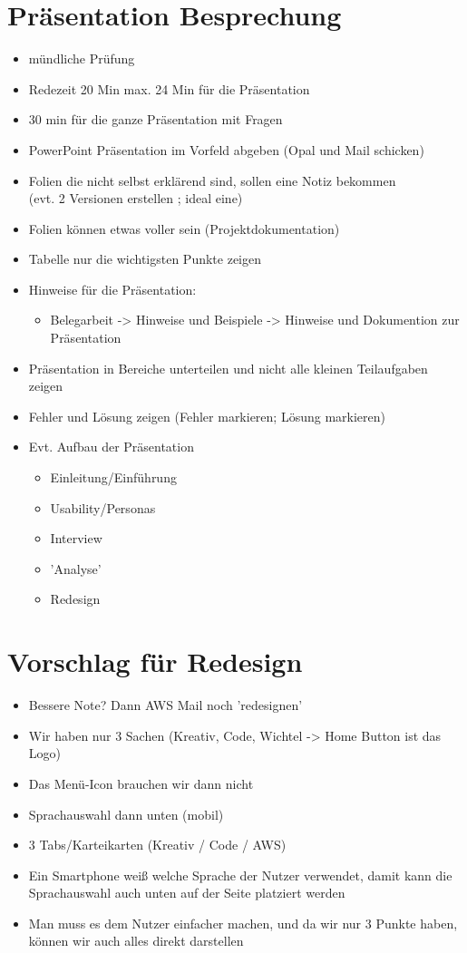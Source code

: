 \documentclass{scrartcl}
\begin{document}
\section{Präsentation Besprechung}
\begin{itemize}
	\item mündliche Prüfung
	\item Redezeit 20 Min max. 24 Min für die Präsentation
	\item 30 min für die ganze Präsentation mit Fragen
	\item PowerPoint Präsentation im Vorfeld abgeben (Opal und Mail schicken)
	\item Folien die nicht selbst erklärend sind, sollen eine Notiz bekommen \\
	(evt. 2 Versionen erstellen ; ideal eine)
	\item Folien können etwas voller sein (Projektdokumentation)
	\item Tabelle nur die wichtigsten Punkte zeigen
	\item Hinweise für die Präsentation: \begin{itemize}
		\item[]Belegarbeit -> Hinweise und Beispiele -> Hinweise und Dokumention zur Präsentation
	\end{itemize}
	\item Präsentation in Bereiche unterteilen und nicht alle kleinen Teilaufgaben zeigen
	\item Fehler und Lösung zeigen (Fehler markieren; Lösung markieren)
	\item[] Evt. Aufbau der Präsentation
	\begin{itemize}
			\item Einleitung/Einführung
			\item Usability/Personas
			\item Interview
			\item 'Analyse'
			\item Redesign
	\end{itemize}
\end{itemize}

\section{Vorschlag für Redesign}
\begin{itemize}
	\item Bessere Note? Dann AWS Mail noch 'redesignen'
	\item Wir haben nur 3 Sachen (Kreativ, Code, Wichtel -> Home Button ist das Logo)
	\item Das Menü-Icon brauchen wir dann nicht
	\item Sprachauswahl dann unten (mobil)
	\item 3 Tabs/Karteikarten (Kreativ / Code / AWS)
	\item Ein Smartphone weiß welche Sprache der Nutzer verwendet, damit kann die Sprachauswahl auch unten auf der Seite platziert werden
	\item Man muss es dem Nutzer einfacher machen, und da wir nur 3 Punkte haben, können wir auch alles direkt darstellen
\end{itemize}
\end{document}
